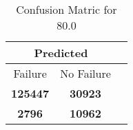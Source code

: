 \begin{table}[] 
\caption{Confusion Matric for 80.0} 
\label{Table: Prediction Accuracy-None80.0RandomForest100EKF-ignoreReflection-Reflection} 
\centering 
\begin{tabular} 
 {@{}ccc@{}} 
\toprule 
\multicolumn{2}{c}{\textbf{Predicted}}
 \\ \midrule 
\multicolumn{1}{|c|}{Failure} & 
\multicolumn{1}{c|}{No Failure}
 \\ \midrule 
\multicolumn{1}{|c|}{\color{green}\textbf{125447}} & 
\multicolumn{1}{c|}{\color{green}\textbf{30923}}
 \\ \midrule 
\multicolumn{1}{|c|}{\color{red}\textbf{2796}} & 
\multicolumn{1}{c|}{\color{red}\textbf{10962}}
 \\ \bottomrule 
\end{tabular} 
\end{table} 
